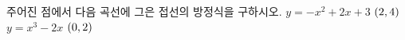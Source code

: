 주어진 점에서 다음 곡선에 그은 접선의 방정식을 구하시오.
 $y=-x^2+2x+3$ \quad $(2{,}\mkern3mu\mathopen{}4)$
 $y=x^3-2x$ \quad $(0{,}\mkern3mu\mathopen{}2)$
